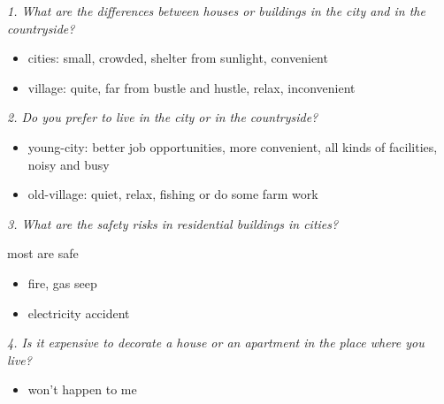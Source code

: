 \documentclass[conference]{IEEEtran}
\begin{document}
\textit{1. What are the differences between houses or buildings in the city and in the countryside?}
\begin{itemize}
    \item cities: small, crowded, shelter from sunlight, convenient
    \item village: quite, far from bustle and hustle, relax, inconvenient
\end{itemize}

\textit{2. Do you prefer to live in the city or in the countryside?}
\begin{itemize}
    \item young-city: better job opportunities, more convenient, all kinds of facilities, noisy and busy
    \item old-village: quiet, relax, fishing or do some farm work
\end{itemize}

\textit{3. What are the safety risks in residential buildings in cities?}

most are safe
\begin{itemize}
    \item fire, gas seep
    \item electricity accident
\end{itemize}

\textit{4. Is it expensive to decorate a house or an apartment in the place where you live?}
\begin{itemize}
    \item won't happen to me
\end{itemize}
\end{document}
